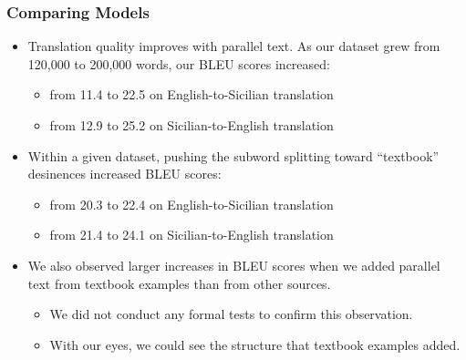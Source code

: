 \documentclass{beamer}
\begin{document}
\begin{frame}
  \frametitle{Comparing Models}
  \vspace{-1.0em}
  \begin{itemize}
  \item Translation quality improves with parallel text.  As our dataset grew
    from 120,000 to 200,000 words, our BLEU scores increased:
    \begin{itemize}
    \item from 11.4 to 22.5 on English-to-Sicilian translation
    \item from 12.9 to 25.2 on Sicilian-to-English translation
    \end{itemize}
  \vspace{0.5em}
  \item Within a given dataset, pushing the subword splitting toward ``textbook'' desinences increased BLEU scores:
    \begin{itemize}
    \item from 20.3 to 22.4 on English-to-Sicilian translation
    \item from 21.4 to 24.1 on Sicilian-to-English translation
    \end{itemize}
  \vspace{0.5em}
  \item We also observed larger increases in BLEU scores when we added parallel text from 
    textbook examples than from other sources.
    \begin{itemize}
    \item We did not conduct any formal tests to confirm this observation.
    \item With our eyes, we could see the structure that textbook examples added.
    \end{itemize}
  \end{itemize} 
\end{frame}

\end{document}

